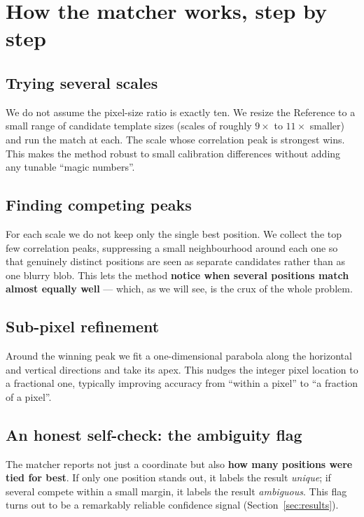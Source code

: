 \documentclass[11pt]{article}
\newcommand{\term}[1]{\textbf{\color{klablue}#1}}
\begin{document}
\section{How the matcher works, step by step}

\subsection{Trying several scales}
We do not assume the pixel-size ratio is exactly ten. We resize the Reference
to a small range of candidate template sizes (scales of roughly
$9\times$ to $11\times$ smaller) and run the match at each. The scale whose
correlation peak is strongest wins. This makes the method robust to small
calibration differences without adding any tunable ``magic numbers''.

\subsection{Finding competing peaks}
For each scale we do not keep only the single best position. We collect the
top few correlation peaks, suppressing a small neighbourhood around each one
so that genuinely distinct positions are seen as separate candidates rather
than as one blurry blob. This lets the method \term{notice when several
positions match almost equally well} --- which, as we will see, is the crux of
the whole problem.

\subsection{Sub-pixel refinement}
Around the winning peak we fit a one-dimensional parabola along the horizontal
and vertical directions and take its apex. This nudges the integer pixel
location to a fractional one, typically improving accuracy from ``within a
pixel'' to ``a fraction of a pixel''.

\subsection{An honest self-check: the ambiguity flag}
The matcher reports not just a coordinate but also \term{how many positions
were tied for best}. If only one position stands out, it labels the result
\emph{unique}; if several compete within a small margin, it labels the result
\emph{ambiguous}. This flag turns out to be a remarkably reliable confidence
signal (Section~\ref{sec:results}).
\end{document}
